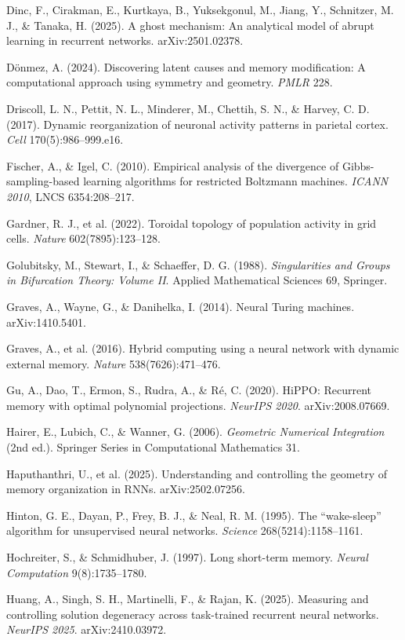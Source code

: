 \documentclass{article}
\begin{document}
Dinc, F., Cirakman, E., Kurtkaya, B., Yuksekgonul, M., Jiang, Y., Schnitzer, M. J., \& Tanaka, H. (2025). A ghost mechanism: An analytical model of abrupt learning in recurrent networks. arXiv:2501.02378.

D\"onmez, A. (2024). Discovering latent causes and memory modification: A computational approach using symmetry and geometry. \emph{PMLR} 228.

Driscoll, L. N., Pettit, N. L., Minderer, M., Chettih, S. N., \& Harvey, C. D. (2017). Dynamic reorganization of neuronal activity patterns in parietal cortex. \emph{Cell} 170(5):986--999.e16.

Fischer, A., \& Igel, C. (2010). Empirical analysis of the divergence of Gibbs-sampling-based learning algorithms for restricted Boltzmann machines. \emph{ICANN 2010}, LNCS 6354:208--217.

Gardner, R. J., et al. (2022). Toroidal topology of population activity in grid cells. \emph{Nature} 602(7895):123--128.

Golubitsky, M., Stewart, I., \& Schaeffer, D. G. (1988). \emph{Singularities and Groups in Bifurcation Theory: Volume II}. Applied Mathematical Sciences 69, Springer.

Graves, A., Wayne, G., \& Danihelka, I. (2014). Neural Turing machines. arXiv:1410.5401.

Graves, A., et al. (2016). Hybrid computing using a neural network with dynamic external memory. \emph{Nature} 538(7626):471--476.

Gu, A., Dao, T., Ermon, S., Rudra, A., \& R\'e, C. (2020). HiPPO: Recurrent memory with optimal polynomial projections. \emph{NeurIPS 2020}. arXiv:2008.07669.

Hairer, E., Lubich, C., \& Wanner, G. (2006). \emph{Geometric Numerical Integration} (2nd ed.). Springer Series in Computational Mathematics 31.

Haputhanthri, U., et al. (2025). Understanding and controlling the geometry of memory organization in RNNs. arXiv:2502.07256.

Hinton, G. E., Dayan, P., Frey, B. J., \& Neal, R. M. (1995). The ``wake-sleep'' algorithm for unsupervised neural networks. \emph{Science} 268(5214):1158--1161.

Hochreiter, S., \& Schmidhuber, J. (1997). Long short-term memory. \emph{Neural Computation} 9(8):1735--1780.

Huang, A., Singh, S. H., Martinelli, F., \& Rajan, K. (2025). Measuring and controlling solution degeneracy across task-trained recurrent neural networks. \emph{NeurIPS 2025}. arXiv:2410.03972.
\end{document}
